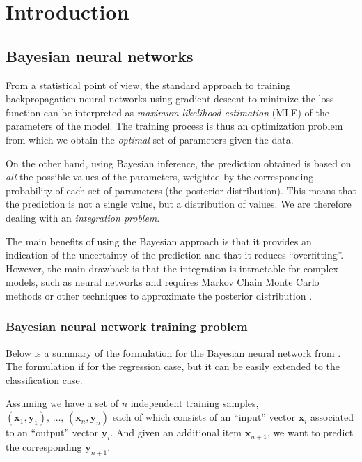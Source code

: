 \section{Introduction}%
\label{sec:introduction}

\subsection{Bayesian neural networks}%
\label{sub:bayesian_neural_networks}

From a statistical point of view, the standard approach to training
backpropagation neural networks using gradient descent to minimize the
loss function can be interpreted as
\emph{maximum likelihood estimation} (MLE) of the parameters of the model.
The training process is thus an optimization problem from which we obtain
the \emph{optimal} set of parameters given the data.

On the other hand, using Bayesian inference, the prediction obtained is based
on \emph{all} the possible values of the parameters, weighted by the corresponding
probability of each set of parameters (the posterior distribution). This means
that the prediction is not a single value, but a distribution of values. We are therefore
dealing with an \emph{integration problem}.

The main benefits of using the Bayesian approach is that it provides an
indication of the uncertainty of the prediction and that it reduces ``overfitting''.
However, the main drawback is that the integration is intractable for
complex models, such as neural networks and requires Markov Chain Monte Carlo
methods or other techniques to approximate the posterior distribution \cite{nealBayesianTrainingBackpropagation1992}.

\subsubsection{Bayesian neural network training problem}%
\label{ssub:bayesian_neural_network_training_problem}

Below is a summary of the formulation for the Bayesian neural network from \textcite{nealBayesianTrainingBackpropagation1992}.
The formulation if for the regression case, but it can be easily extended to the classification case.

Assuming we have a set of $n$ independent training samples,
$\left(\textbf{x}_1,  \textbf{y}_1 \right),\,\dots,\,\left(\textbf{x}_n,  \textbf{y}_n \right)$
each of which consists of an ``input'' vector $\textbf{x}_i$ associated to an ``output'' vector $\textbf{y}_i$.
And given an additional item $\textbf{x}_{n+1}$, we want to predict the corresponding $\textbf{y}_{n+1}$.


